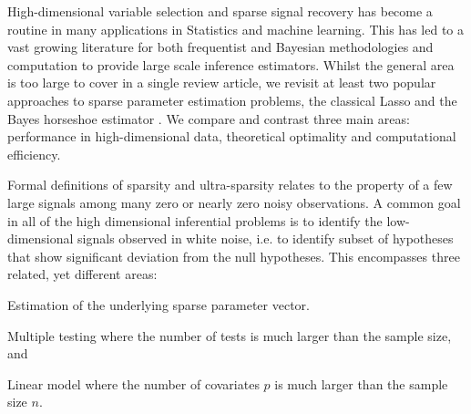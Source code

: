 \documentclass[11pt]{article}
\numberwithin{equation}{section}
\begin{document}


High-dimensional variable selection and sparse signal recovery has become a routine in many applications in Statistics and machine learning. This has led to a vast growing literature for both frequentist and Bayesian methodologies and computation to provide large scale inference estimators. Whilst the general area is too large to cover in a single review article, we revisit at least two popular approaches to sparse parameter estimation problems, the classical Lasso \citep{tibshirani96} and the Bayes horseshoe estimator \citep{carvalho2010horseshoe}. We compare and contrast three main areas: performance in high-dimensional data, theoretical optimality and computational efficiency. 

Formal definitions of sparsity and ultra-sparsity relates to the property of a few large signals among many zero or nearly zero noisy observations. A common goal in all of the high dimensional inferential problems is to identify the low-dimensional signals observed in white noise, i.e. to identify subset of hypotheses that show significant deviation from the null hypotheses. This encompasses three related, yet different areas: 
\ben
\item Estimation of the underlying sparse parameter vector. 
\item Multiple testing where the number of tests is much larger than the sample size, and 
\item Linear model where the number of covariates $p$ is much larger than the sample size $n$. 
\een
\end{document}
